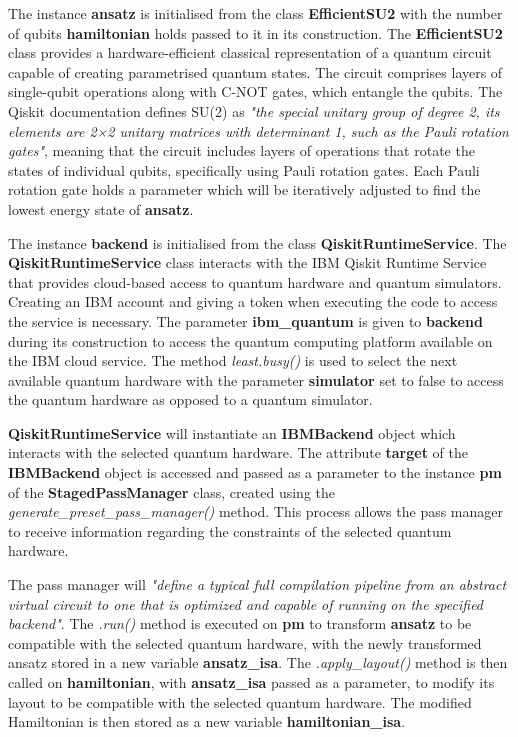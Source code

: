 \documentclass{article}
\begin{document}
The instance \textbf{ansatz} is initialised from the class \textbf{EfficientSU2} with the number of qubits \textbf{hamiltonian} holds passed to it in its construction. The \textbf{EfficientSU2} class provides a hardware-efficient classical representation of a quantum circuit capable of creating parametrised quantum states. The circuit comprises layers of single-qubit operations along with C-NOT gates, which entangle the qubits. The Qiskit documentation defines SU(2) as \textit{"the special unitary group of degree 2, its elements are 2×2 unitary matrices with determinant 1, such as the Pauli rotation gates"}\cite{EfficientSU2}, meaning that the circuit includes layers of operations that rotate the states of individual qubits, specifically using Pauli rotation gates. Each Pauli rotation gate holds a parameter which will be iteratively adjusted to find the lowest energy state of \textbf{ansatz}.

The instance \textbf{backend} is initialised from the class \textbf{QiskitRuntimeService}. The \textbf{QiskitRuntimeService} class interacts with the IBM Qiskit Runtime Service that provides cloud-based access to quantum hardware and quantum simulators. Creating an IBM account and giving a token when executing the code to access the service is necessary. The parameter \textbf{ibm\_quantum} is given to \textbf{backend} during its construction to access the quantum computing platform available on the IBM cloud service. The method \textit{least.busy()} is used to select the next available quantum hardware with the parameter \textbf{simulator} set to false to access the quantum hardware as opposed to a quantum simulator. 

\textbf{QiskitRuntimeService} will instantiate an \textbf{IBMBackend} object which interacts with the selected quantum hardware. The attribute \textbf{target} of the \textbf{IBMBackend} object is accessed and passed as a parameter to the instance \textbf{pm} of the \textbf{StagedPassManager} class, created using the \textit{generate\_preset\_pass\_manager()} method. This process allows the pass manager to receive information regarding the constraints of the selected quantum hardware.

The pass manager will \textit{"define a typical full compilation pipeline from an abstract virtual circuit to one that is optimized and capable of running on the specified backend"}\cite{StagedPassManager}. The \textit{.run()} method is executed on \textbf{pm} to transform \textbf{ansatz} to be compatible with the selected quantum hardware, with the newly transformed ansatz stored in a new variable \textbf{ansatz\_isa}. The \textit{.apply\_layout()} method is then called on \textbf{hamiltonian}, with \textbf{ansatz\_isa} passed as a parameter, to modify its layout to be compatible with the selected quantum hardware. The modified Hamiltonian is then stored as a new variable  \textbf{hamiltonian\_isa}.
\end{document}
